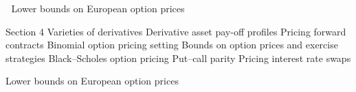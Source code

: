 

Lower bounds on European option prices

Section 4
Varieties of derivatives 
Derivative asset pay-off profiles 
Pricing forward contracts 
Binomial option pricing setting 
Bounds on option prices and exercise strategies
Black–Scholes option pricing 
Put–call parity 
Pricing interest rate swaps

Lower bounds on European option prices











